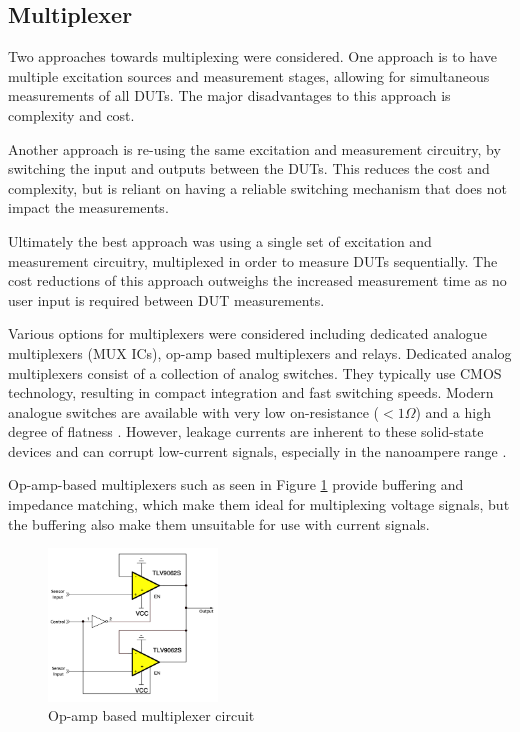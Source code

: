 \subsection{Multiplexer}
Two approaches towards multiplexing were considered. One approach is to have multiple excitation sources and measurement stages, allowing for simultaneous measurements of all \acp{DUT}.  The major disadvantages to this approach is complexity and cost.

Another approach is re-using the same excitation and measurement circuitry, by switching the input and outputs between the \acp{DUT}. This reduces the cost and complexity, but is reliant on having a reliable switching mechanism that does not impact the measurements.

Ultimately the best approach was using a single set of excitation and measurement circuitry, multiplexed in order to measure \acp{DUT} sequentially. The cost reductions of this approach outweighs the increased measurement time as no user input is required between \ac{DUT} measurements.

Various options for multiplexers were considered including dedicated analogue multiplexers (MUX ICs), op-amp based multiplexers and relays. Dedicated analog multiplexers consist of a collection of analog switches. They typically use CMOS technology, resulting in compact integration and fast switching speeds. Modern analogue switches are available with very low on-resistance ($<1\Omega$) and a high degree of flatness \cite{SelectingRightCMOS}. However, leakage currents are inherent to these solid-state devices and can corrupt low-current signals, especially in the nanoampere range \cite{SelectingRightCMOS}. 

Op-amp-based multiplexers such as seen in Figure \ref{fig:opamp_mux} provide buffering and impedance matching, which make them ideal for multiplexing voltage signals, but the buffering also make them unsuitable for use with current signals.

\begin{figure}[H]
    \centering
    \includegraphics[width=0.4\textwidth]{OpAmpMux.png}
    \caption{Op-amp based multiplexer circuit \cite{Sboa311a}}
    \label{fig:opamp_mux}
\end{figure}

